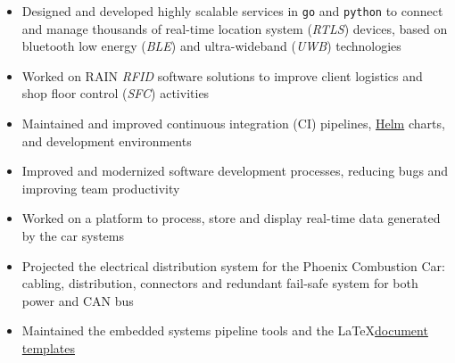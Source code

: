 \documentclass[9pt,a4paper,ragged2e,withhyper]{altacv}
\begin{document}
\begin{paracol}{2}


\begin{itemize}
  \item Designed and developed highly scalable services in \texttt{go} and \texttt{python} to connect and manage thousands of real-time location system (\textit{RTLS}) devices, based on bluetooth low energy (\textit{BLE}) and ultra-wideband (\textit{UWB}) technologies
  \item Worked on RAIN \textit{RFID} software solutions to improve client logistics and shop floor control (\textit{SFC}) activities
  \item Maintained and improved continuous integration (CI) pipelines, \href{https://helm.sh/}{Helm} charts, and development environments
  \item Improved and modernized software development processes, reducing bugs and improving team productivity
\end{itemize}


\begin{itemize}
  \item Worked on a platform to process, store and display real-time data generated by the car systems
  \item Projected the electrical distribution system for the Phoenix Combustion Car: cabling, distribution, connectors and redundant fail-safe system for both power and CAN bus
  \item Maintained the embedded systems pipeline tools and the \LaTeX \linebreak \href{https://github.com/engeniusua/engenius-ua-latex-template}{document templates}
\end{itemize}




\end{paracol}
\end{document}
